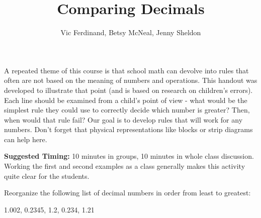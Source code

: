 \documentclass{ximera}
\title{Comparing Decimals}
\author{Vic Ferdinand, Betsy McNeal, Jenny Sheldon}
\begin{document}
\begin{abstract}\end{abstract}
\maketitle

\begin{instructorIntro}
A repeated theme of this course is that school math can devolve into rules that often are not based on the meaning of numbers and operations.  This handout was developed to illustrate that point (and is based on research on children's errors).  Each line should be examined from a child's point of view - what would be the simplest rule they could use to correctly decide which number is greater? Then, when would that rule fail? Our goal is to develop rules that will work for any numbers.  Don't forget that physical representations like blocks or strip diagrams can help here.


{\bf Suggested Timing:} 10 minutes in groups, 10 minutes in whole class discussion.  Working the first and second examples as a class generally makes this activity quite clear for the students.
\end{instructorIntro}

\begin{question}
 Reorganize the following list of decimal numbers in order from least to greatest:\\

\begin{center}
    1.002, 0.2345, 1.2,  0.234, 1.21
\end{center}

\end{question}
\end{document}
